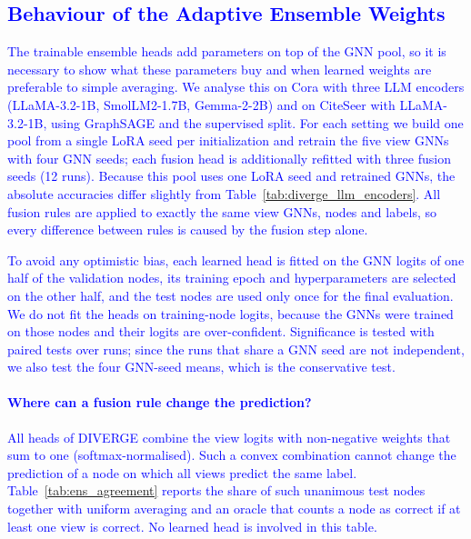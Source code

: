\documentclass[a4paper,fleqn]{cas-sc}
\newcommand{\revtwo}[1]{\textcolor{blue}{#1}}  %
\begin{document}
\subsection{\revtwo{Behaviour of the Adaptive Ensemble Weights}}
\label{sec:ensemble_weight_analysis}

\revtwo{The trainable ensemble heads add parameters on top of the GNN pool, so it is necessary to show what these parameters buy and when learned weights are preferable to simple averaging. We analyse this on Cora with three LLM encoders (LLaMA-3.2-1B, SmolLM2-1.7B, Gemma-2-2B) and on CiteSeer with LLaMA-3.2-1B, using GraphSAGE and the supervised split. For each setting we build one pool from a single LoRA seed per initialization and retrain the five view GNNs with four GNN seeds; each fusion head is additionally refitted with three fusion seeds (12 runs). Because this pool uses one LoRA seed and retrained GNNs, the absolute accuracies differ slightly from Table~\ref{tab:diverge_llm_encoders}. All fusion rules are applied to exactly the same view GNNs, nodes and labels, so every difference between rules is caused by the fusion step alone.}

\revtwo{To avoid any optimistic bias, each learned head is fitted on the GNN logits of one half of the validation nodes, its training epoch and hyperparameters are selected on the other half, and the test nodes are used only once for the final evaluation. We do not fit the heads on training-node logits, because the GNNs were trained on those nodes and their logits are over-confident. Significance is tested with paired tests over runs; since the runs that share a GNN seed are not independent, we also test the four GNN-seed means, which is the conservative test.}

\paragraph{\revtwo{Where can a fusion rule change the prediction?}}
\revtwo{All heads of DIVERGE combine the view logits with non-negative weights that sum to one (softmax-normalised). Such a convex combination cannot change the prediction of a node on which all views predict the same label. Table~\ref{tab:ens_agreement} reports the share of such unanimous test nodes together with uniform averaging and an oracle that counts a node as correct if at least one view is correct. No learned head is involved in this table.}
\end{document}
